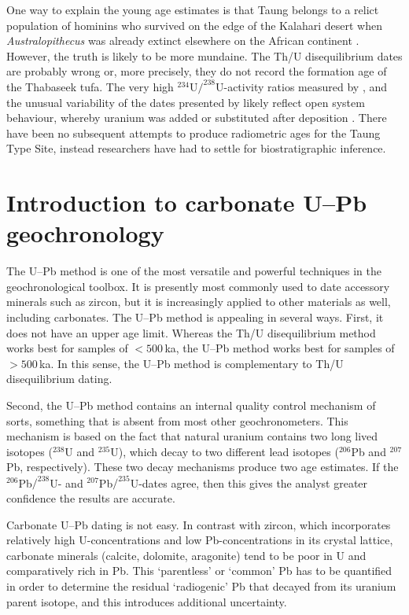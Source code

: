 \documentclass[11pt]{article}
\begin{document}
One way to explain the young age estimates is that Taung belongs to a
relict population of hominins who survived on the edge of the Kalahari
desert when \emph{Australopithecus} was already extinct elsewhere on
the African continent \citep{tobias1973, tobias1993,
  mckee1993}. However, the truth is likely to be more mundaine. The
Th/U disequilibrium dates are probably wrong or, more precisely, they
do not record the formation age of the Thabaseek tufa. The very high
${}^{234}$U${/}^{238}$U-activity ratios measured by \citet{vogel1984},
and the unusual variability of the dates presented by
\citet{tobias1993} likely reflect open system behaviour, whereby
uranium was added or substituted after deposition \citep{tobias1993}.
There have been no subsequent attempts to produce radiometric ages for
the Taung Type Site, instead researchers have had to settle for
biostratigraphic inference.

\section{Introduction to carbonate U--Pb geochronology}
\label{sec:UPb-method}

The U--Pb method is one of the most versatile and powerful techniques
in the geochronological toolbox. It is presently most commonly used to
date accessory minerals such as zircon, but it is increasingly applied
to other materials as well, including carbonates. The U--Pb method is
appealing in several ways. First, it does not have an upper age
limit. Whereas the Th/U disequilibrium method works best for samples
of $<500\,$ka, the U--Pb method works best for samples of $>500\,$ka.
In this sense, the U--Pb method is complementary to Th/U
disequilibrium dating.

Second, the U--Pb method contains an internal quality control
mechanism of sorts, something that is absent from most other
geochronometers. This mechanism is based on the fact that natural
uranium contains two long lived isotopes ($^{238}$U and $^{235}$U),
which decay to two different lead isotopes ($^{206}$Pb and $^{207}$Pb,
respectively).  These two decay mechanisms produce two age
estimates. If the ${}^{206}$Pb${/}^{238}$U- and
${}^{207}$Pb${/}^{235}$U-dates agree, then this gives the analyst
greater confidence the results are accurate.

Carbonate U--Pb dating is not easy.  In contrast with zircon, which
incorporates relatively high U-concentrations and low
Pb-concentrations in its crystal lattice, carbonate minerals (calcite,
dolomite, aragonite) tend to be poor in U and comparatively rich in
Pb. This `parentless' or `common' Pb has to be quantified in order to
determine the residual `radiogenic' Pb that decayed from its uranium
parent isotope, and this introduces additional uncertainty.
\end{document}
